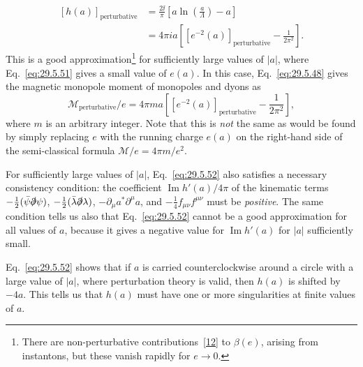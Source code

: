 \begin{equation}
  \begin{aligned}
  [h(a)]_{\mathrm{perturbative}}
  &=\frac{2\ii}{\pi}\left[
    a\ln\left(\frac{a}{\Lambda}\right)-a
  \right]
  \\
  &=4\pi ia\left[
    \left[e^{-2}(a)\right]_{\mathrm{perturbative}}
    -\frac{1}{2\pi^2}
  \right].
  \end{aligned}
  \tag{29.5.52}\label{eq:29.5.52}
\end{equation}
\enlargethispage{2pt}
This is a good approximation\footnote{There are non-perturbative
contributions~\hyperref[ch29-ref-12]{[12]} to \(\beta(e)\), arising from
instantons, but these vanish rapidly for \(e\longrightarrow0\).} for
sufficiently large values of \(\lvert a\rvert\), where
Eq.~\eqref{eq:29.5.51} gives a small value of \(e(a)\). In this case,
Eq.~\eqref{eq:29.5.48} gives the magnetic monopole moment of monopoles and
dyons as
\begin{equation}
  \mathcal{M}_{\mathrm{perturbative}}/e
  =4\pi ma\left[
    \left[e^{-2}(a)\right]_{\mathrm{perturbative}}
    -\frac{1}{2\pi^2}
  \right],
  \tag{29.5.53}\label{eq:29.5.53}
\end{equation}
where \(m\) is an arbitrary integer. Note that this is \textit{not} the same
as would be found by simply replacing \(e\) with the running charge \(e(a)\)
on the right-hand side of the semi-classical formula
\(\mathcal{M}/e=4\pi m/e^2\).

{\setlength{\emergencystretch}{1em}%
For sufficiently large values of \(\lvert a\rvert\), Eq.~\eqref{eq:29.5.52}
also satisfies a necessary consistency condition: the coefficient
\(\operatorname{Im}h'(a)/4\pi\) of the kinematic terms
\(-\tfrac12(\bar\psi\sl{\partial}\psi)\),
\(-\tfrac12(\bar\lambda\sl{\partial}\lambda)\),
\(-\partial_\mu a^*\partial^\mu a\), and
\(-\tfrac14f_{\mu\nu}f^{\mu\nu}\) must be \textit{positive}. The same
condition tells us also that Eq.~\eqref{eq:29.5.52} cannot be a good
approximation for all values of \(a\), because it gives a negative value for
\(\operatorname{Im}h'(a)\) for \(\lvert a\rvert\) sufficiently small.\par}

Eq.~\eqref{eq:29.5.52} shows that if \(a\) is carried counterclockwise around
a circle with a large value of \(\lvert a\rvert\), where perturbation theory
is valid, then \(h(a)\) is shifted by \(-4a\). This tells us that \(h(a)\)
must have one or more singularities at finite values of \(a\).

